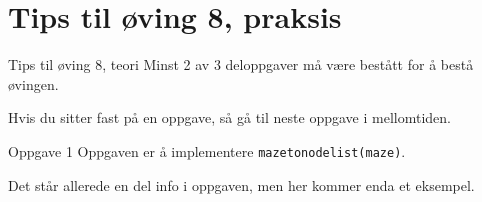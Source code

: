 \documentclass[14pt]{beamer}
\begin{document}
\section{Tips til øving 8, praksis}
\begin{frame}{Tips til øving 8, teori}
    Minst 2 av 3 deloppgaver må være bestått for å bestå øvingen.

    \pause

    Hvis du sitter fast på en oppgave, så gå til neste oppgave i mellomtiden.
\end{frame}
\begin{frame}[fragile]{Oppgave 1}
    Oppgaven er å implementere \verb|mazetonodelist(maze)|.

    \pause

    Det står allerede en del info i oppgaven, men her kommer enda et eksempel.
\end{frame}
\end{document}
